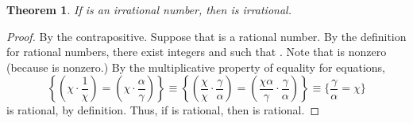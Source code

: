 \documentclass[preview]{standalone}
\newtheorem{theorem}{Theorem}
\begin{document}
\begin{theorem} %
    If \bm{$\chi$} is an irrational number, 
    then  is irrational.
\end{theorem}

\begin{proof}
    By the contrapositive. 
    Suppose that  is a rational number. 
    By the definition for rational numbers, 
    there exist integers \bm{$\alpha$} and \bm{$\gamma$} such that 
    . 
    Note that \bm{$\alpha$} is nonzero (because  is nonzero.) 
    By the multiplicative property of equality for equations,
    \begin{equation*}
        \left\{
            \left(
                \chi \cdot \frac{1}{\chi}
            \right) 
                = 
            \left(
                \chi \cdot \frac{\alpha}{\gamma}
            \right)
        \right\} 
            \equiv
        \left\{
            \left(
                \frac{\chi}{\chi} \cdot \frac{\gamma}{\alpha}
            \right) 
                = 
            \left(
                \frac{\chi \alpha}{\gamma} \cdot \frac{\gamma}{\alpha}
            \right)
        \right\} 
            \equiv
        \bigg\{
            \frac{\gamma}{\alpha} 
                = 
            \chi
        \bigg\}
    \end{equation*}
    \bm{$\frac{\gamma}{\alpha} \textbf{ = } \chi$} is rational, 
    by definition. 
    Thus, if  is rational, 
    then \bm{$\chi$} is rational.
\end{proof}
\end{document}
